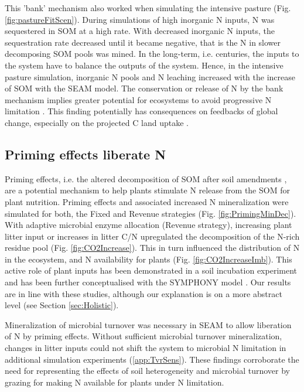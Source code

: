 This 'bank' mechanism \citep[sensu][]{Perveen14} also worked when simulating the
intensive pasture (Fig. \ref{fig:pastureFitScen}). During simulations of high
inorganic N inputs, N was sequestered in SOM at a high rate. With decreased
inorganic N inputs, the sequestration rate decreased until it became negative,
that is the N in slower decomposing SOM pools was mined. In the
long-term, i.e.
centuries, the inputs to the system have to balance the outputs of the system. Hence, in
the intensive pasture simulation, inorganic N pools and N leaching increased with
the increase of SOM with the SEAM model. The conservation or release of N by the
bank mechanism implies greater potential for ecosystems to avoid progressive N
limitation \citep{Norby10, Franklin14, Averill15}. This finding
potentially has consequences on feedbacks of global change, especially on the
projected C land uptake \citep{Friedlingstein14}.

\subsection{Priming effects liberate N}
Priming effects, i.e. the altered decomposition of SOM after soil amendments
\citep{Kuzyakov00}, are a potential mechanism to help plants stimulate N release
from the SOM for plant nutrition.
Priming effects and associated increased N mineralization were simulated for
both, the Fixed and Revenue strategies (Fig. \ref{fig:PrimingMinDec}). With
adaptive microbial enzyme allocation (Revenue strategy), increasing
plant litter input or increases in litter C/N upregulated
the decomposition of the N-rich residue pool (Fig.
\ref{fig:CO2Increase}).
This in turn influenced the distribution of N in the ecosystem, and N
availability for plants (Fig.
\ref{fig:CO2IncreaseImb}). This active role of plant inputs has been
demonstrated in a soil incubation experiment \citep{Fontaine11} and has been
further conceptualised with the SYMPHONY model \citep{Perveen14}. Our results
are in line with these studies, although our explanation is on a more abstract
level (see Section \ref{sec:Holistic}). 

Mineralization of microbial turnover was necessary in SEAM to allow liberation
of N by priming effects. Without sufficient microbial turnover
mineralization, changes in litter inputs could not shift the system to
microbial N limitation in additional simulation experiments (\ref{app:TvrSens}).
These findings corroborate the need for representing the effects of soil
heterogeneity \citep{Manzoni08} and microbial turnover by grazing
\citep{Clarholm85, Raynaud06} for making N available for plants under N
limitation.

